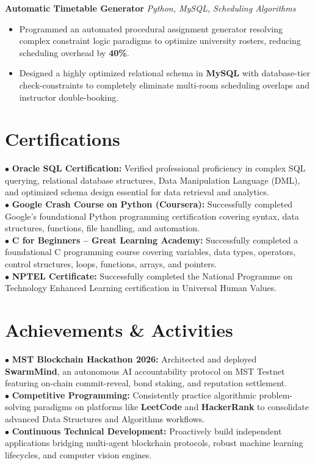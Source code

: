 \documentclass[a4paper,10pt]{article}
\begin{document}
\vspace{2pt}
\textbf{Automatic Timetable Generator} \hfill \textit{Python, MySQL, Scheduling Algorithms}
\begin{itemize}
    \item Programmed an automated procedural assignment generator resolving complex constraint logic paradigms to optimize university rosters, reducing scheduling overhead by \textbf{40\%}.
    \item Designed a highly optimized relational schema in \textbf{MySQL} with database-tier check-constraints to completely eliminate multi-room scheduling overlaps and instructor double-booking.
\end{itemize}

\section{Certifications}
\small
$\bullet$ \textbf{Oracle SQL Certification:} Verified professional proficiency in complex SQL querying, relational database structures, Data Manipulation Language (DML), and optimized schema design essential for data retrieval and analytics.\\
$\bullet$ \textbf{Google Crash Course on Python (Coursera):} Successfully completed Google's foundational Python programming certification covering syntax, data structures, functions, file handling, and automation.\\
$\bullet$ \textbf{C for Beginners -- Great Learning Academy:} Successfully completed a foundational C programming course covering variables, data types, operators, control structures, loops, functions, arrays, and pointers.\\
$\bullet$ \textbf{NPTEL Certificate:} Successfully completed the National Programme on Technology Enhanced Learning certification in Universal Human Values.

\section{Achievements \& Activities}
\small
$\bullet$ \textbf{MST Blockchain Hackathon 2026:} Architected and deployed \textbf{SwarmMind}, an autonomous AI accountability protocol on MST Testnet featuring on-chain commit-reveal, bond staking, and reputation settlement.\\
$\bullet$ \textbf{Competitive Programming:} Consistently practice algorithmic problem-solving paradigms on platforms like \textbf{LeetCode} and \textbf{HackerRank} to consolidate advanced Data Structures and Algorithms workflows.\\
$\bullet$ \textbf{Continuous Technical Development:} Proactively build independent applications bridging multi-agent blockchain protocols, robust machine learning lifecycles, and computer vision engines.
\end{document}

